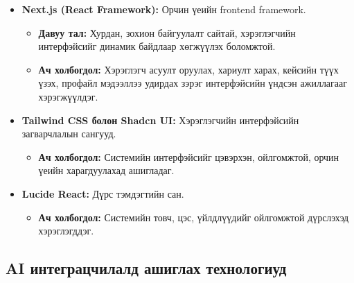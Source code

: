 \begin{itemize}

    \item \textbf{Next.js (React Framework):} Орчин үеийн frontend framework.
    \begin{itemize}
        \item \textbf{Давуу тал:} Хурдан, зохион байгуулалт сайтай, хэрэглэгчийн интерфэйсийг динамик байдлаар хөгжүүлэх боломжтой.
        \item \textbf{Ач холбогдол:} Хэрэглэгч асуулт оруулах, хариулт харах, кейсийн түүх үзэх, профайл мэдээллээ удирдах зэрэг интерфэйсийн үндсэн ажиллагааг хэрэгжүүлдэг.
    \end{itemize}

    \item \textbf{Tailwind CSS болон Shadcn UI:} Хэрэглэгчийн интерфэйсийн загварчлалын сангууд.
    \begin{itemize}
        \item \textbf{Ач холбогдол:} Системийн интерфэйсийг цэвэрхэн, ойлгомжтой, орчин үеийн харагдуулахад ашигладаг.
    \end{itemize}

    \item \textbf{Lucide React:} Дүрс тэмдэгтийн сан.
    \begin{itemize}
        \item \textbf{Ач холбогдол:} Системийн товч, цэс, үйлдлүүдийг ойлгомжтой дүрслэхэд хэрэглэгддэг.
    \end{itemize}

\end{itemize}

\subsection{AI интеграцчилалд ашиглах технологиуд}

